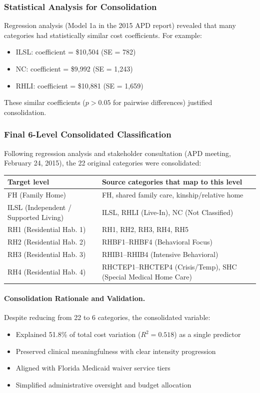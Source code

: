 \subsubsection{Statistical Analysis for Consolidation}

Regression analysis (Model 1a in the 2015 APD report) revealed that many categories had statistically similar cost coefficients. For example:
\begin{itemize}
    \item ILSL: coefficient = \$10,504 (SE = 782)
    \item NC: coefficient = \$9,992 (SE = 1,243)
    \item RHLI: coefficient = \$10,881 (SE = 1,659)
\end{itemize}

These similar coefficients ($p > 0.05$ for pairwise differences) justified consolidation.

\subsubsection{Final 6-Level Consolidated Classification}

Following regression analysis and stakeholder consultation (APD meeting, February 24, 2015), the 22 original categories were consolidated:

\begin{center}
\begin{tabular}{|l|p{10.5cm}|}
\hline
\textbf{Target level} & \textbf{Source categories that map to this level} \\
\hline
FH (Family Home) &
FH, shared family care, kinship/relative home \\
\hline
ILSL (Independent / Supported Living) &
ILSL, RHLI (Live-In), NC (Not Classified) \\
\hline
RH1 (Residential Hab. 1) &
RH1, RH2, RH3, RH4, RH5 \\
\hline
RH2 (Residential Hab. 2) &
RHBF1--RHBF4 (Behavioral Focus) \\
\hline
RH3 (Residential Hab. 3) &
RHIB1--RHIB4 (Intensive Behavioral) \\
\hline
RH4 (Residential Hab. 4) &
RHCTEP1--RHCTEP4 (Crisis/Temp), SHC (Special Medical Home Care) \\
\hline
\end{tabular}
\end{center}

\paragraph{Consolidation Rationale and Validation.}
Despite reducing from 22 to 6 categories, the consolidated variable:
\begin{itemize}
    \item Explained 51.8\% of total cost variation ($R^2 = 0.518$) as a single predictor
    \item Preserved clinical meaningfulness with clear intensity progression
    \item Aligned with Florida Medicaid waiver service tiers
    \item Simplified administrative oversight and budget allocation
\end{itemize}


